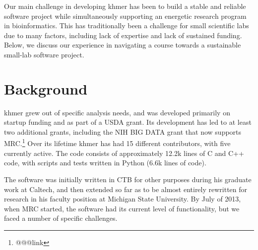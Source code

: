 \documentclass[11pt]{article}
\begin{document}
Our main challenge in developing khmer has been to build a stable and
reliable software project while simultaneously supporting an energetic
research program in bioinformatics.  This has traditionally been a
challenge for small scientific labs due to many factors, including
lack of expertise and lack of sustained funding.  Below, we discuss
our experience in navigating a course towards a sustainable small-lab
software project.

\section{Background}

khmer grew out of specific analysis needs, and was developed primarily
on startup funding and as part of a USDA grant.  Its development has
led to at least two additional grants, including the NIH BIG DATA
grant that now supports MRC.\footnote{@@@link}  Over its lifetime
khmer has had 15 different contributors, with five currently active.
The code consists of approximately 12.2k lines of C and C++ code, with
scripts and tests written in Python (6.6k lines of code).

The software was initially written in CTB for other purposes during
his graduate work at Caltech, and then extended so far as to be almost
entirely rewritten for research in his faculty position at Michigan
State University.  By July of 2013, when MRC started, the software had
its current level of functionality, but we faced a number of specific
challenges.
\end{document}
